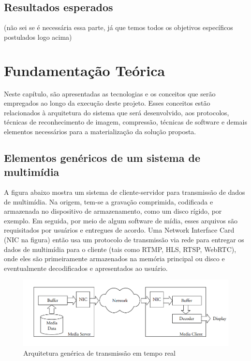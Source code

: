 \documentclass[12pt, %
openright, 
oneside, %
a4paper,    %
brazil]{facom-ufu-abntex2}
\begin{document}
\section{Resultados esperados}

 (não sei se é necessária essa parte, já que temos todos os objetivos específicos postulados logo acima)

\chapter{Fundamentação Teórica}

Neste capítulo, são apresentadas as tecnologias e os conceitos que serão
empregados ao longo da execução deste projeto. Esses conceitos estão
relacionados à arquitetura do sistema que será desenvolvido, aos protocolos,
técnicas de reconhecimento de imagem, compressão, técnicas de software e demais
elementos necessários para a materialização da solução proposta.

\section{Elementos genéricos de um sistema de multimídia}

A figura abaixo mostra um sistema de cliente-servidor para transmissão de dados
de multimídia. Na origem, tem-se a gravação comprimida, codificada e armazenada
no dispositivo de armazenamento, como um disco rígido, por exemplo. Em seguida,
por meio de algum software de mídia, esses arquivos são requisitados por
usuários e entregues de acordo. Uma Network Interface Card (NIC na figura)
então usa um protocolo de transmissão via rede para entregar os dados de
multimídia para o cliente (tais como RTMP, HLS, RTSP, WebRTC), onde eles são
primeiramente armazenados na memória principal ou disco e eventualmente
decodificados e apresentados ao usuário.

\begin{figure}[!ht]
	\centering
	\includegraphics[width=1\linewidth]{Capturar.PNG}
	\caption[Representação de um arquitetura de tempo real genérica]{Arquitetura genérica de transmissão em tempo real}
	\label{fig:graficosVariandoTamanhoRede}
\end{figure}
\end{document}
